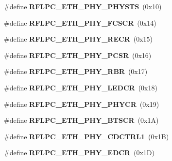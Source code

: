\begin{DoxyCompactItemize}
\item 
\hypertarget{group__eth_ga2d4daf217bf0acdb798618ea556b675a}{\#define {\bfseries R\-F\-L\-P\-C\-\_\-\-E\-T\-H\-\_\-\-P\-H\-Y\-\_\-\-P\-H\-Y\-S\-T\-S}~(0x10)}\label{group__eth_ga2d4daf217bf0acdb798618ea556b675a}

\item 
\hypertarget{group__eth_ga64f0216f03fa8732fca30f0a7b29cb38}{\#define {\bfseries R\-F\-L\-P\-C\-\_\-\-E\-T\-H\-\_\-\-P\-H\-Y\-\_\-\-F\-C\-S\-C\-R}~(0x14)}\label{group__eth_ga64f0216f03fa8732fca30f0a7b29cb38}

\item 
\hypertarget{group__eth_ga454bc667cbcea754e3d2d281f95b69dd}{\#define {\bfseries R\-F\-L\-P\-C\-\_\-\-E\-T\-H\-\_\-\-P\-H\-Y\-\_\-\-R\-E\-C\-R}~(0x15)}\label{group__eth_ga454bc667cbcea754e3d2d281f95b69dd}

\item 
\hypertarget{group__eth_ga2f59f048e5491024eebdfdc5b656754e}{\#define {\bfseries R\-F\-L\-P\-C\-\_\-\-E\-T\-H\-\_\-\-P\-H\-Y\-\_\-\-P\-C\-S\-R}~(0x16)}\label{group__eth_ga2f59f048e5491024eebdfdc5b656754e}

\item 
\hypertarget{group__eth_ga3852fc97957d14742c5ff1e54219fffa}{\#define {\bfseries R\-F\-L\-P\-C\-\_\-\-E\-T\-H\-\_\-\-P\-H\-Y\-\_\-\-R\-B\-R}~(0x17)}\label{group__eth_ga3852fc97957d14742c5ff1e54219fffa}

\item 
\hypertarget{group__eth_ga0ad28459659b41815315211809231b02}{\#define {\bfseries R\-F\-L\-P\-C\-\_\-\-E\-T\-H\-\_\-\-P\-H\-Y\-\_\-\-L\-E\-D\-C\-R}~(0x18)}\label{group__eth_ga0ad28459659b41815315211809231b02}

\item 
\hypertarget{group__eth_ga0f29c7568bef1f60685104245527f33c}{\#define {\bfseries R\-F\-L\-P\-C\-\_\-\-E\-T\-H\-\_\-\-P\-H\-Y\-\_\-\-P\-H\-Y\-C\-R}~(0x19)}\label{group__eth_ga0f29c7568bef1f60685104245527f33c}

\item 
\hypertarget{group__eth_ga317ddff7336effcf43921495fe868363}{\#define {\bfseries R\-F\-L\-P\-C\-\_\-\-E\-T\-H\-\_\-\-P\-H\-Y\-\_\-B\-T\-S\-C\-R}~(0x1\-A)}\label{group__eth_ga317ddff7336effcf43921495fe868363}

\item 
\hypertarget{group__eth_ga7f2b2cdb597b71e6d96269af6e5dce18}{\#define {\bfseries R\-F\-L\-P\-C\-\_\-\-E\-T\-H\-\_\-\-P\-H\-Y\-\_\-\-C\-D\-C\-T\-R\-L1}~(0x1\-B)}\label{group__eth_ga7f2b2cdb597b71e6d96269af6e5dce18}

\item 
\hypertarget{group__eth_ga6beca66d6b5762545f6c9a48dfcac9f2}{\#define {\bfseries R\-F\-L\-P\-C\-\_\-\-E\-T\-H\-\_\-\-P\-H\-Y\-\_\-\-E\-D\-C\-R}~(0x1\-D)}\label{group__eth_ga6beca66d6b5762545f6c9a48dfcac9f2}

\end{DoxyCompactItemize}
